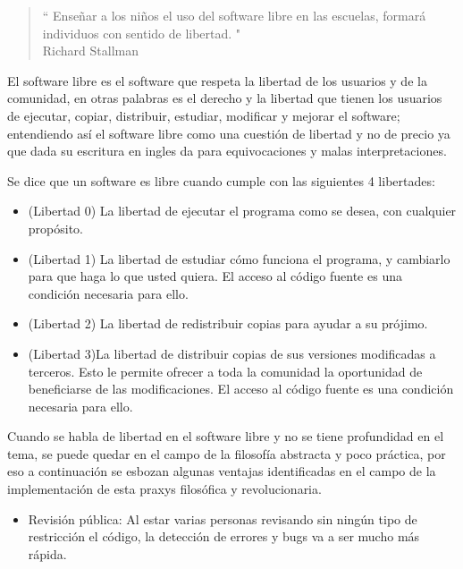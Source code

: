 \begin{multicols}{2}

\begin{quote}
\raggedleft
“ Enseñar a los niños el uso del software libre en las escuelas, formará individuos con sentido de libertad. "\\
 Richard Stallman

\end{quote}

El software libre es el software que respeta la libertad de los usuarios y de la comunidad, en otras palabras es el derecho y la libertad que tienen los usuarios de ejecutar, copiar, distribuir, estudiar, modificar y mejorar el software; entendiendo así el software libre como una cuestión de libertad y no de precio ya que dada su escritura en ingles da para equivocaciones y malas interpretaciones.

Se dice que un software es libre cuando cumple con las siguientes 4 libertades:
\begin{itemize}
\item (Libertad 0) La libertad de ejecutar el programa como se desea, con cualquier propósito.
\item (Libertad 1) La libertad de estudiar cómo funciona el programa, y cambiarlo para que haga lo que usted quiera. El acceso al código fuente es una condición necesaria para ello.
\item (Libertad 2) La libertad de redistribuir copias para ayudar a su prójimo.
\item (Libertad 3)La libertad de distribuir copias de sus versiones modificadas a terceros. Esto le permite ofrecer a toda la comunidad la oportunidad de beneficiarse de las modificaciones. El acceso al código fuente es una condición necesaria para ello.
\end{itemize}




Cuando se habla de libertad en el software libre y no se tiene profundidad en el tema, se puede quedar en el campo de la filosofía abstracta y poco práctica, por eso a continuación se esbozan algunas ventajas identificadas en el campo de la implementación de esta praxys filosófica y revolucionaria.

\begin{itemize}
\item Revisión pública: Al estar varias personas revisando sin ningún tipo de restricción el código, la detección de errores y bugs va a ser mucho más rápida.



\end{itemize}
\end{multicols}
